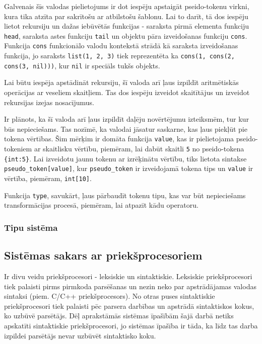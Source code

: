 
Galvenais šīs valodas pielietojums ir dot iespēju apstaigāt pseido-tokenu virkni, kura tika atzīta par sakrītošu ar atbilstošu šablonu. Lai to darīt, tā dos iespēju lietot rekursiju un dažas iebūvētās funkcijas - saraksta pirmā elementa funkciju \verb|head|, saraksta astes funkciju \verb|tail| un objektu pāra izveidošanas funkciju \verb|cons|. Funkcija \verb|cons| funkcionālo valodu kontekstā strādā kā saraksta izveidošanas funkcija, jo saraksts \verb|list(1, 2, 3)| tiek reprezentēta ka \verb|cons(1, cons(2, cons(3, nil)))|, kur \verb|nil| ir speciāls tukšs objekts.


Lai būtu iespēja apstādināt rekursiju, šī valoda arī ļaus izpildīt aritmētiskās operācijas ar veseliem skaitļiem. Tas dos iespēju izveidot skaitītājus un izveidot rekursijas izejas nosacījumus.

Ir plānots, ka šī valoda arī ļaus izpildīt daļēju novērtējumu izteiksmēm, tur kur būs nepieciešams. Tas nozīmē, ka valodai jāsatur saskarne, kas ļaus piekļūt pie tokena vērtības. Šim mērķim ir domāta funkcija \verb|value|, kas ir pielietojama pseido-tokeniem ar skaitlisku vērtību, piemēram, lai dabūt skaitli \verb|5| no pseido-tokena \verb|{int:5}|. Lai izveidotu jaunu tokenu ar izrēķinātu vērtību, tiks lietota sintakse \verb|pseudo_token[value]|, kur \verb|pseudo_token| ir izveidojamā tokena tips un \verb|value| ir vērtība, piemēram, \verb|int[10]|.

Funkcija \verb|type|, savukārt, ļaus pārbaudīt tokenu tipu, kas var būt nepieciešams transformācijas procesā, piemēram, lai atpazīt kādu operatoru.

\subsubsection{Tipu sistēma}


\subsection{Sistēmas sakars ar priekšprocesoriem}
Ir divu veidu priekšprocesori - leksiskie un sintaktiskie. Leksiskie priekšprocesori tiek palaisti pirms pirmkoda parsēšanas un nezin neko par apstrādājamas valodas sintaksi (piem. C/C++ priekšprocesors). No otras puses sintaktiskie priekšprocesori tiek palaisti pēc parsera darbības un apstrādā sintaktiskos kokus, ko uzbūvē parsētājs. Dēļ aprakstāmās sistēmas īpašībām šajā darbā netiks apskatīti sintaktiskie priekšprocesori, jo sistēmas īpašība ir tāda, ka līdz tas darba izpildei parsētājs nevar uzbūvēt sintaktisko koku.

